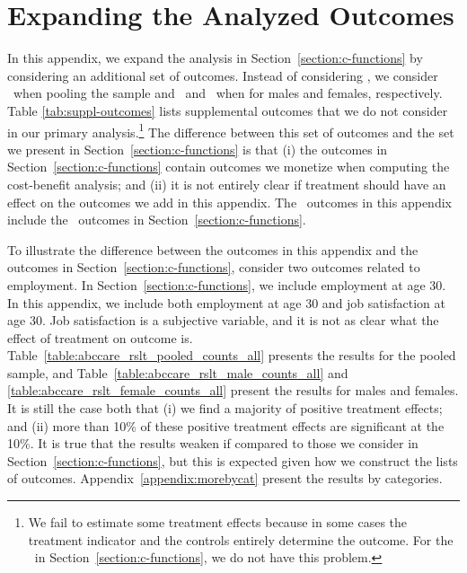 \section{{Expanding the Analyzed Outcomes}} \label{appendix:moreoutcomes}

\noindent In this appendix, we expand the analysis in Section~\ref{section:c-functions} by considering an additional set of outcomes. Instead of considering \noutcomes, we consider \noutcomesexpp\ when pooling the sample and \noutcomesexpm\ and \noutcomesexpf\ when for males and females, respectively. Table \ref{tab:suppl-outcomes} lists supplemental outcomes that we do not consider in our primary analysis.\footnote{We fail to estimate some treatment effects because in some cases the treatment indicator and the controls entirely determine the outcome. For the \noutcomes\ in Section~\ref{section:c-functions}, we do not have this problem.} The difference between this set of outcomes and the set we present in Section~\ref{section:c-functions} is that (i) the outcomes in Section~\ref{section:c-functions} contain outcomes we monetize when computing the cost-benefit analysis; and (ii) it is not entirely clear if treatment should have an effect on the outcomes we add in this appendix. The \noutcomesexpp\ outcomes in this appendix include the \noutcomes\ outcomes in Section~\ref{section:c-functions}.\\

\singlespacing

\doublespacing

\noindent To illustrate the difference between the outcomes in this appendix and the outcomes in Section~\ref{section:c-functions}, consider two outcomes related to employment. In Section~\ref{section:c-functions}, we include employment at age 30. In this appendix, we include both employment at age 30 and job satisfaction at age 30. Job satisfaction is a subjective variable, and it is not as clear what the effect of treatment on outcome is.\\

\noindent Table~\ref{table:abccare_rslt_pooled_counts_all} presents the results for the pooled sample, and Table~\ref{table:abccare_rslt_male_counts_all} and \ref{table:abccare_rslt_female_counts_all} present the results for males and females. It is still the case both that (i) we find a majority of positive treatment effects; and (ii) more than 10\% of these positive treatment effects are significant at the 10\%. It is true that the results weaken if compared to those we consider in Section~\ref{section:c-functions}, but this is expected given how we construct the lists of outcomes. Appendix~\ref{appendix:morebycat} present the results by categories.


